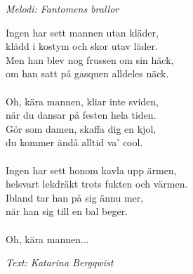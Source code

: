 {\footnotesize\textit{Melodi: Fantomens brallor}}\par
\vspace{10pt}
Ingen har sett mannen utan kläder,\\
klädd i kostym och skor utav läder.\\
Men han blev nog frussen om sin häck,\\
om han satt på gasquen alldeles näck.\\
\\
Oh, kära mannen, kliar inte sviden,\\
när du dansar på festen hela tiden.\\
Gör som damen, skaffa dig en kjol,\\
du kommer ändå alltid va' cool.\\
\\
Ingen har sett honom kavla upp ärmen,\\
helsvart lekdräkt trots fukten och värmen.\\
Ibland tar han på sig ännu mer,\\
när han sig till en bal beger.\\
\\
Oh, kära mannen...
\par
\vspace{10pt}
{\footnotesize\textit{Text: Katarina Bergqwist}}
